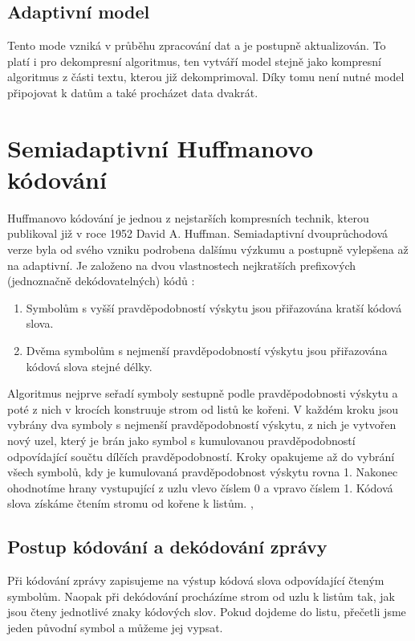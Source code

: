 \subsection{Adaptivní model}
Tento mode vzniká v průběhu zpracování dat a je postupně aktualizován. To platí i pro dekompresní algoritmus, ten vytváří model stejně jako kompresní algoritmus z části textu, kterou již dekomprimoval. Díky tomu není nutné model připojovat k datům a také procházet data dvakrát.

\section{Semiadaptivní Huffmanovo kódování}
\label{huffmanovoKodovani}
Huffmanovo kódování je jednou z nejstarších kompresních technik, kterou publikoval již v roce 1952 David A. Huffman. Semiadaptivní dvouprůchodová verze byla od svého vzniku podrobena dalšímu výzkumu a postupně vylepšena až na adaptivní. Je založeno na dvou vlastnostech nejkratších prefixových (jednoznačně dekódovatelných) kódů \cite{introductionToDataCompression}:

\begin{enumerate}
\item Symbolům s vyšší pravděpodobností výskytu jsou přiřazována kratší kódová slova.
\item Dvěma symbolům s nejmenší pravděpodobností výskytu jsou přiřazována kódová slova stejné délky.
\end{enumerate}

Algoritmus nejprve seřadí symboly sestupně podle pravděpodobnosti výskytu a poté z nich v krocích konstruuje strom od listů ke kořeni. V každém kroku jsou vybrány dva symboly s nejmenší pravděpodobností výskytu, z nich je vytvořen nový uzel, který je brán jako symbol s kumulovanou pravděpodobností odpovídající součtu dílčích pravděpodobností. Kroky opakujeme až do vybrání všech symbolů, kdy je kumulovaná pravděpodobnost výskytu rovna 1. Nakonec ohodnotíme hrany vystupující z uzlu vlevo číslem 0 a vpravo číslem 1. Kódová slova získáme čtením stromu od kořene k listům. \cite{dataCompression}, \cite{introductionToDataCompression}

\subsection{Postup kódování a dekódování zprávy}
Při kódování zprávy zapisujeme na výstup kódová slova odpovídající čteným symbolům. Naopak při dekódování procházíme strom od uzlu k listům tak, jak jsou čteny jednotlivé znaky kódových slov. Pokud dojdeme do listu, přečetli jsme jeden původní symbol a můžeme jej vypsat.

